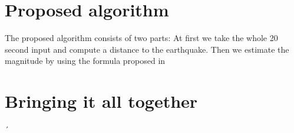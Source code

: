 \documentclass[thesis.tex]{subfiles}
\begin{document}
\section{Proposed algorithm}
The proposed algorithm consists of two parts: At first we take the whole 20 second input and compute a distance to the earthquake. Then we estimate the magnitude by using the formula proposed in  

\section{Bringing it all together}
´
\subfilebib %
\end{document}
